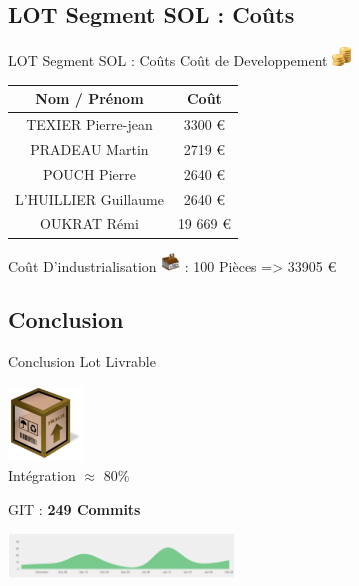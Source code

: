 \documentclass[11pt]{beamer}
\begin{document}
	\subsection{LOT Segment SOL : Coûts}
	\begin{frame}{LOT Segment SOL : Coûts}
	Coût de Developpement   \includegraphics[width=0.5cm]{common/coins.png}\\
	\begin{center}
	\begin{tabular}{|c|c|}
			\hline
			\rowcolor{yellow}Nom / Prénom & Coût\\
			\hline
			TEXIER Pierre-jean  & 3300 \euro \\
			\hline
			PRADEAU Martin  & 2719 \euro \\
			POUCH Pierre  & 2640 \euro \\
			L'HUILLIER Guillaume  & 2640 \euro \\
			OUKRAT Rémi  & 19 669 \euro \\
			\hline
			\end{tabular}
			\end{center}
			
	Coût D'industrialisation \includegraphics[width=0.5cm]{common/industry.png} : 100 Pièces => 33905 \euro
	\end{frame}
	
	
	\subsection{Conclusion}
	\begin{frame}{Conclusion}
	Lot Livrable
	\begin{center}
	 	\includegraphics[width=2cm]{common/deliverables.png} \\
	 	Intégration $\approx$ 80\%
	\end{center}
	GIT : \textbf{249 Commits}
	\begin{center}
	 	\includegraphics[width=6cm]{common/git.png} 
	\end{center}
	\end{frame}
	
\end{document}
